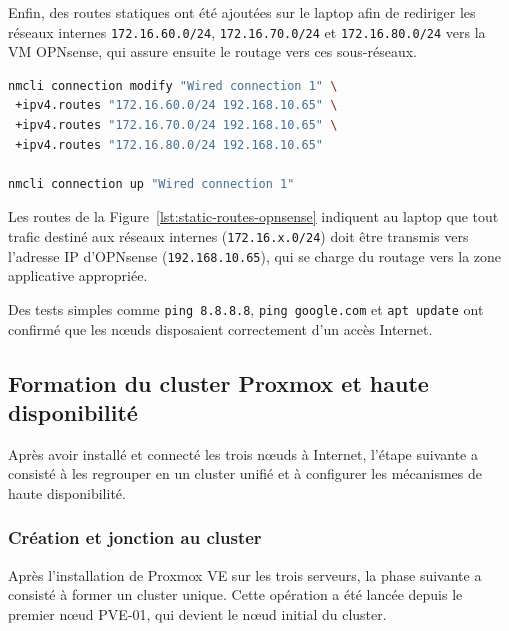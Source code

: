 \par Enfin, des routes statiques ont été ajoutées sur le laptop afin de rediriger les réseaux internes \texttt{172.16.60.0/24}, \texttt{172.16.70.0/24} et \texttt{172.16.80.0/24} vers la VM OPNsense, qui assure ensuite le routage vers ces sous-réseaux.\\

\begin{lstlisting}[style=sonacode,language=bash,caption={Ajout des routes statiques vers OPNsense},label={lst:static-routes-opnsense}]
nmcli connection modify "Wired connection 1" \
 +ipv4.routes "172.16.60.0/24 192.168.10.65" \
 +ipv4.routes "172.16.70.0/24 192.168.10.65" \
 +ipv4.routes "172.16.80.0/24 192.168.10.65"

nmcli connection up "Wired connection 1"
\end{lstlisting}

\par Les routes de la Figure~\ref{lst:static-routes-opnsense} indiquent au laptop que tout trafic destiné aux réseaux internes (\texttt{172.16.x.0/24}) doit être transmis vers l'adresse IP d'OPNsense (\texttt{192.168.10.65}), qui se charge du routage vers la zone applicative appropriée.\\

\par Des tests simples comme \texttt{ping 8.8.8.8}, \texttt{ping google.com} et \texttt{apt update} ont confirmé que les nœuds disposaient correctement d'un accès Internet.\\

\subsection{Formation du cluster Proxmox et haute disponibilité}

\par Après avoir installé et connecté les trois nœuds à Internet, l'étape suivante a consisté à les regrouper en un cluster unifié et à configurer les mécanismes de haute disponibilité.

\subsubsection{Création et jonction au cluster}

\par Après l'installation de Proxmox VE sur les trois serveurs, la phase suivante a consisté à former un cluster unique. Cette opération a été lancée depuis le premier nœud PVE-01, qui devient le nœud initial du cluster.\\

